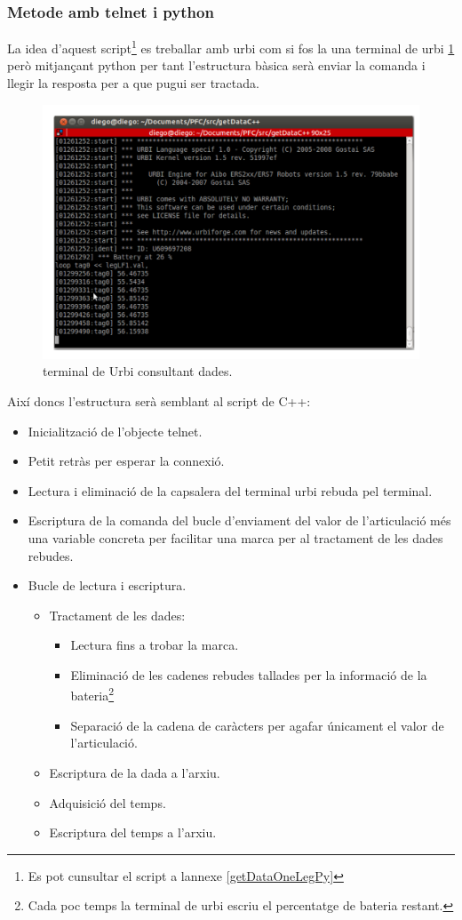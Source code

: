 \documentclass[12pt,a4paper,final,twoside]{article}
\begin{document}
\subsubsection{Metode amb telnet i python}
La idea d'aquest script\footnote{Es pot cunsultar el script a lannexe \ref{getDataOneLegPy}} es treballar amb urbi com si fos la una terminal de urbi \ref{fig:telnet} però mitjançant python per tant l'estructura bàsica serà enviar la comanda i llegir la resposta per a que pugui ser tractada. 
\begin{figure}[h!]
	\centering
    \includegraphics[scale=0.65]{images/telnet.pdf}
	 \caption{terminal de Urbi consultant dades.}
  \label{fig:telnet}
\end{figure}
Així doncs l'estructura serà semblant al script de C++:
\begin{itemize}
\item Inicialització de l'objecte telnet.
\item Petit retràs per esperar la connexió.
\item Lectura i eliminació de la capsalera del terminal urbi rebuda pel terminal.
\item Escriptura de la comanda del bucle d'enviament del valor de l'articulació més una variable concreta per facilitar una marca per al tractament de les dades rebudes.
\item Bucle de lectura i escriptura.
\begin{itemize}
\item Tractament de les dades:
\begin{itemize}
\item Lectura fins a trobar la marca.
\item Eliminació de les cadenes rebudes tallades per la informació de la bateria\footnote{Cada poc temps la terminal de urbi escriu el percentatge de bateria restant.}
\item Separació de la cadena de caràcters per agafar únicament el valor de l'articulació.
\
\end{itemize}
\item Escriptura de la dada a l'arxiu.
\item Adquisició del temps.
\item Escriptura del temps a l'arxiu.
\end{itemize} 
\end{itemize}
\end{document}
